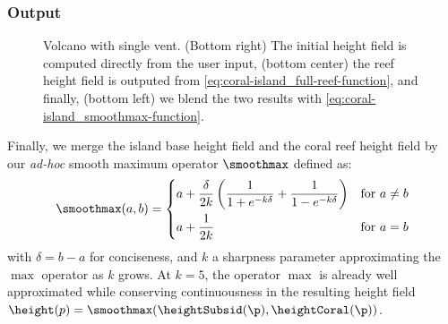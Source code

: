 

\subsubsection{Output}
\label{sec:coral-island_procedural-output}

\begin{figure}
    \caption{Volcano with single vent. (Bottom right) The initial height field is computed directly from the user input, (bottom center) the reef height field is outputed from \cref{eq:coral-island_full-reef-function}, and finally, (bottom left) we blend the two results with \cref{eq:coral-island_smoothmax-function}.}
    \label{fig:coral-island_volcano-example}
\end{figure}

Finally, we merge the island base height field and the coral reef height field by our \textit{ad-hoc} smooth maximum operator $\smoothmax$ defined as:
\begin{align}
    \label{eq:coral-island_smoothmax-function}
    \smoothmax(a, b) = \begin{dcases}
        a + \frac{\delta}{2k} \left( \frac{1}{1+e^{-k\delta}} + \frac{1}{1-e^{-k\delta}} \right) &\text{for } a \neq b \\
        a + \frac{1}{2k} &\text{for } a = b
    \end{dcases}
\end{align} 
with $\delta=b-a$ for conciseness, and $k$ a sharpness parameter approximating the $\max$ operator as $k$ grows. At $k=5$, the operator $\max$ is already well approximated while conserving continuousness in the resulting height field $\height(p) = \smoothmax(\heightSubsid(\p), \heightCoral(\p))$.

